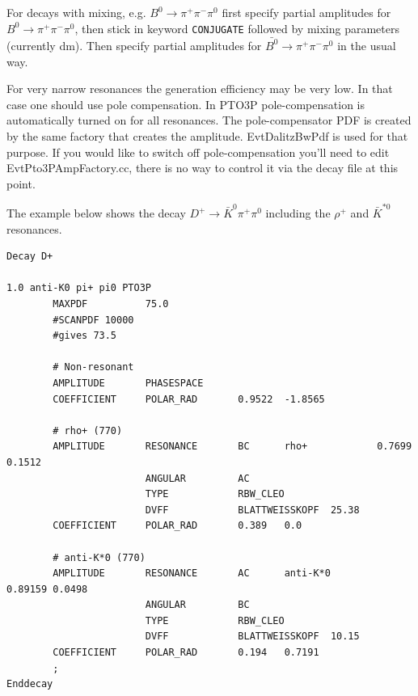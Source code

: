 For decays with mixing, e.g. $B^0 \to \pi^+ \pi^- \pi^0$ first 
specify partial amplitudes for $B^0 \to \pi^+ \pi^- \pi^0$,
then stick in keyword \texttt{CONJUGATE} followed by mixing 
parameters (currently dm). Then specify partial amplitudes for
$\bar{B^0}   \to \pi^+ \pi^- \pi^0$ in the usual way.


For very narrow resonances the generation efficiency may be very low. 
In that case one should use pole compensation. In PTO3P pole-compensation is 
automatically turned on for all resonances. The pole-compensator PDF is created by 
the same factory that creates the amplitude. EvtDalitzBwPdf is used for that purpose.
If you would like to switch off pole-compensation you'll need to edit EvtPto3PAmpFactory.cc,
there is no way to control it via the decay file at this point.

\Example
The example below shows the decay $D^+\to \bar K^0\pi^+\pi^0$ including
the $\rho^+$ and $\bar K^{*0}$ resonances.

\begin{verbatim}
Decay D+

1.0 anti-K0 pi+ pi0 PTO3P       
        MAXPDF          75.0
        #SCANPDF 10000
        #gives 73.5

        # Non-resonant
        AMPLITUDE       PHASESPACE
        COEFFICIENT     POLAR_RAD       0.9522  -1.8565

        # rho+ (770) 
        AMPLITUDE       RESONANCE       BC      rho+            0.7699  0.1512
                        ANGULAR         AC
                        TYPE            RBW_CLEO
                        DVFF            BLATTWEISSKOPF  25.38
        COEFFICIENT     POLAR_RAD       0.389   0.0 

        # anti-K*0 (770) 
        AMPLITUDE       RESONANCE       AC      anti-K*0        0.89159 0.0498
                        ANGULAR         BC
                        TYPE            RBW_CLEO
                        DVFF            BLATTWEISSKOPF  10.15
        COEFFICIENT     POLAR_RAD       0.194   0.7191
        ;
Enddecay

\end{verbatim}

